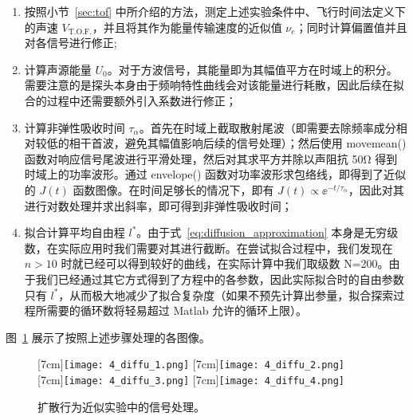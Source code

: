 \begin{enumerate}
  \item 按照小节~\ref{sec:tof} 中所介绍的方法，测定上述实验条件中、飞行时间法定义下的声速 $V_{\text{T.O.F.}}$，并且将其作为能量传输速度的近似值 $\nu_{e}$；同时计算偏置值并且对各信号进行修正;
  \item 计算声源能量 $U_{0}$。对于方波信号，其能量即为其幅值平方在时域上的积分。需要注意的是探头本身由于频响特性曲线会对该能量进行耗散，因此后续在拟合的过程中还需要额外引入系数进行修正；
  \item 计算非弹性吸收时间 $\tau_{\alpha}$。首先在时域上截取散射尾波（即需要去除频率成分相对较低的相干首波，避免其幅值影响后续的信号处理）；然后使用 movemean() 函数对响应信号尾波进行平滑处理，然后对其求平方并除以声阻抗 50\unit{\ohm} 得到时域上的功率波形。通过 envelope() 函数对功率波形求包络线，即得到了近似的 $J(t)$ 函数图像。在时间足够长的情况下，即有 $J(t)\propto {\ee}^{-t/\tau_{\alpha}}$，因此对其进行对数处理并求出斜率，即可得到非弹性吸收时间；
  \item 拟合计算平均自由程 $l^{*}$。由于式~\eqref{eq:diffusion_approximation} 本身是无穷级数，在实际应用时我们需要对其进行截断。在尝试拟合过程中，我们发现在 $n>10$ 时就已经可以得到较好的曲线，在实际计算中我们取级数 N=200。由于我们已经通过其它方式得到了方程中的各参数，因此实际拟合时的自由参数只有 $l^{*}$，从而极大地减少了拟合复杂度（如果不预先计算出参量，拟合探索过程所需要的循环数将轻易超过 Matlab 允许的循环上限）。
\end{enumerate}

图~\ref{fig:diffusion_approximation} 展示了按照上述步骤处理的各图像。

\begin{figure}[htb]
  \centering
                  [7cm]{\texttt{[image: 4\_diffu\_1.png]}}
  \hfill
                  [7cm]{\texttt{[image: 4\_diffu\_2.png]}}
  \\
                  [7cm]{\texttt{[image: 4\_diffu\_3.png]}}
  \hfill
                  [7cm]{\texttt{[image: 4\_diffu\_4.png]}}
  \caption{扩散行为近似实验中的信号处理。\label{fig:diffusion_approximation}}%
  \end{figure}

